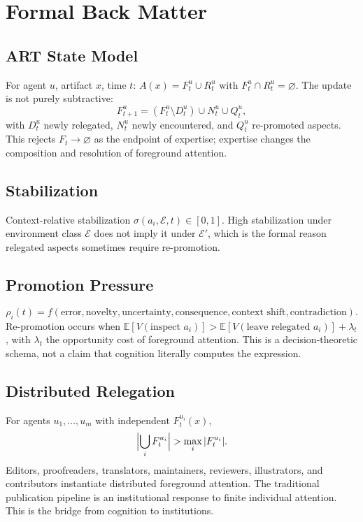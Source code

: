 \documentclass[11pt,openany]{book}
\newcommand{\E}{\mathbb{E}}
\begin{document}
\appendix
\part*{Formal Back Matter}

\chapter{ART State Model}
For agent $u$, artifact $x$, time $t$:
$A(x)=F_t^u\cup R_t^u$ with $F_t^u\cap R_t^u=\varnothing$. The update is
not purely subtractive:
\[
  F_{t+1}^u=(F_t^u\setminus D_t^u)\cup N_t^u\cup Q_t^u,
\]
with $D_t^u$ newly relegated, $N_t^u$ newly encountered, and $Q_t^u$
re-promoted aspects. This rejects $F_t\to\varnothing$ as the endpoint of
expertise; expertise changes the composition and resolution of foreground
attention.

\chapter{Stabilization}
Context-relative stabilization $\sigma(a_i,\mathcal E,t)\in[0,1]$. High
stabilization under environment class $\mathcal E$ does not imply it under
$\mathcal E'$, which is the formal reason relegated aspects sometimes
require re-promotion.

\chapter{Promotion Pressure}
\[
  \rho_i(t)=f(\text{error},\text{novelty},\text{uncertainty},
  \text{consequence},\text{context shift},\text{contradiction}).
\]
Re-promotion occurs when
$\E[V(\text{inspect }a_i)]>\E[V(\text{leave relegated }a_i)]+\lambda_t$,
with $\lambda_t$ the opportunity cost of foreground attention. This is a
decision-theoretic schema, not a claim that cognition literally computes
the expression.

\chapter{Distributed Relegation}
For agents $u_1,\ldots,u_m$ with independent $F_t^{u_i}(x)$,
\[
  \Bigl|\bigcup_i F_t^{u_i}\Bigr|>\max_i |F_t^{u_i}|.
\]
Editors, proofreaders, translators, maintainers, reviewers, illustrators,
and contributors instantiate distributed foreground attention. The
traditional publication pipeline is an institutional response to finite
individual attention. This is the bridge from cognition to institutions.
\end{document}
